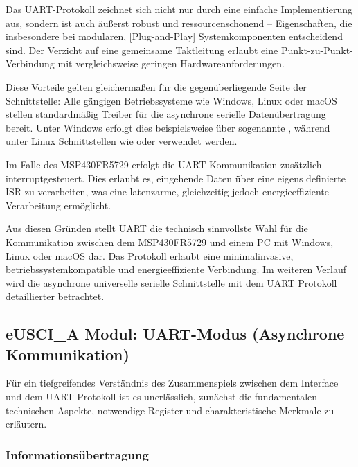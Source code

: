 \newpage
Das UART-Protokoll zeichnet sich nicht nur durch eine einfache Implementierung aus, sondern ist auch \"au{\ss}erst robust und ressourcenschonend -- Eigenschaften, die insbesondere bei modularen, [Plug-and-Play] Systemkomponenten entscheidend sind. Der Verzicht auf eine gemeinsame Taktleitung erlaubt eine Punkt-zu-Punkt-Verbindung mit vergleichsweise geringen Hardwareanforderungen. 

Diese Vorteile gelten gleicherma{\ss}en f\"ur die gegen\"uberliegende Seite der Schnittstelle: Alle g\"angigen Betriebssysteme wie Windows, Linux oder macOS stellen standardm\"a{\ss}ig Treiber f\"ur die asynchrone serielle Daten\"ubertragung bereit. Unter Windows erfolgt dies beispielsweise \"uber sogenannte , w\"ahrend unter Linux Schnittstellen wie  oder  verwendet werden. 

Im Falle des MSP430FR5729 erfolgt die UART-Kommunikation zus\"atzlich interruptgesteuert. Dies erlaubt es, eingehende Daten \"uber eine eigens definierte ISR zu verarbeiten, was eine latenzarme, gleichzeitig jedoch energieeffiziente Verarbeitung erm\"oglicht. 

Aus diesen Gr\"unden stellt UART die technisch sinnvollste Wahl f\"ur die Kommunikation zwischen dem MSP430FR5729 und einem PC mit Windows, Linux oder macOS dar. Das Protokoll erlaubt eine minimalinvasive, betriebssystemkompatible und energieeffiziente Verbindung. Im weiteren Verlauf wird die asynchrone universelle serielle Schnittstelle mit dem UART Protokoll detaillierter betrachtet.\AI

\newpage
\subsection{eUSCI\_A Modul: UART-Modus (Asynchrone Kommunikation)}
\label{sec:eUSCI_UART}

F\"ur ein tiefgreifendes Verst\"andnis des Zusammenspiels zwischen dem Interface und dem UART-Protokoll ist es unerl\"asslich, zun\"achst die fundamentalen technischen Aspekte, notwendige Register und charakteristische Merkmale zu erl\"autern.

\subsubsection{Informations\"ubertragung}
\label{sec:UART_uebertragung}

